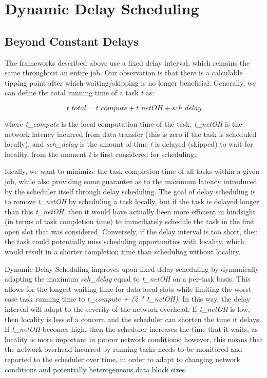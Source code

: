 \section{Dynamic Delay Scheduling}\label{sec:dynamic}

\subsection{Beyond Constant Delays}

The frameworks described above use a fixed delay interval, 
which remains the same throughout an entire job. Our observation is that there is a 
calculable tipping point after which waiting/skipping is no longer beneficial. Generally,
we can define the total running time of a task \textit{t} as:

\[
t\_total = t\_compute + t\_netOH + sch\_delay
\]

where \textit{t\_compute} is the local computation time of the task, \textit{t\_netOH}
is the network latency incurred from data transfer (this is zero if the task is scheduled 
locally), and \textit{sch\_delay} is the amount of time \textit{t} is delayed 
(skipped) to wait for locality, from the moment \textit{t} is first considered for 
scheduling.

Ideally, we want to minimize the task completion time of all tasks within a given job, 
while also providing some guarantee as to the maximum latency introduced by the scheduler
itself through delay scheduling. The goal of delay scheduling is to remove \textit{t\_netOH} by 
scheduling a task locally, but if the task is delayed longer than this \textit{t\_netOH}, 
then it would have actually been more efficient in hindsight (in terms of task completion time) 
to immediately schedule the task in the first open slot that was considered. 
Conversely, if the delay interval is too short, then the task could potentially miss 
scheduling opportunities with locality, which would result in a shorter completion time
than scheduling without locality.

Dynamic Delay Scheduling improves upon fixed delay 
scheduling by dynamically adapting the maximum 
\textit{sch\_delay} equal to \textit{t\_netOH} on a per-task basis. This allows 
for the longest waiting time for data-local slots while limiting the worst case task 
running time to \textit{t\_compute + (2 * t\_netOH)}. In this way, the delay interval
will adapt to the severity of the network overhead. If \textit{t\_netOH} is low, then locality
is less of a concern and the scheduler can shorten the time it delays. If \textit{t\_netOH} becomes high,
then the scheduler increases the time that it waits, as locality is more important in poorer network
conditions; however, this means that the 
network overhead incurred by running tasks needs to be monitored and reported to the 
scheduler over time, in order to adapt to changing network conditions and potentially 
heterogeneous data block sizes. 

